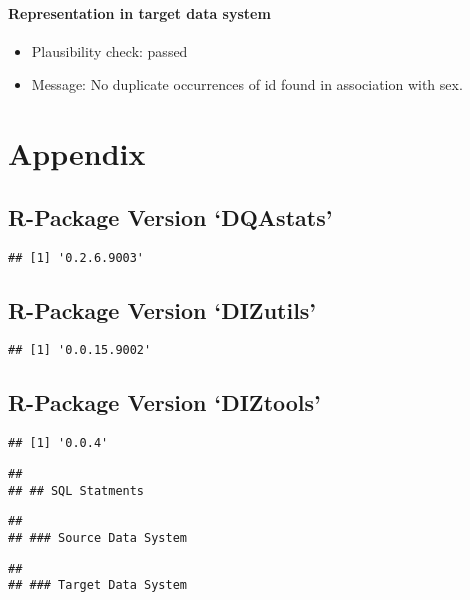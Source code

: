 \documentclass[
]{article}
\providecommand{\tightlist}{%
  \setlength{\itemsep}{0pt}\setlength{\parskip}{0pt}}
\begin{document}
\hypertarget{representation-in-target-data-system-31}{%
\paragraph{Representation in target data
system}\label{representation-in-target-data-system-31}}

\begin{itemize}
\tightlist
\item
  Plausibility check: passed
\item
  Message: No duplicate occurrences of id found in association with sex.
\end{itemize}

\newpage

\hypertarget{appendix}{%
\section{Appendix}\label{appendix}}

\hypertarget{r-package-version-dqastats}{%
\subsection{R-Package Version
`DQAstats'}\label{r-package-version-dqastats}}

\begin{verbatim}
## [1] '0.2.6.9003'
\end{verbatim}

\hypertarget{r-package-version-dizutils}{%
\subsection{R-Package Version
`DIZutils'}\label{r-package-version-dizutils}}

\begin{verbatim}
## [1] '0.0.15.9002'
\end{verbatim}

\hypertarget{r-package-version-diztools}{%
\subsection{R-Package Version
`DIZtools'}\label{r-package-version-diztools}}

\begin{verbatim}
## [1] '0.0.4'
\end{verbatim}

\begin{verbatim}
## 
## ## SQL Statments
\end{verbatim}

\begin{verbatim}
## 
## ### Source Data System
\end{verbatim}

\begin{verbatim}
## 
## ### Target Data System
\end{verbatim}
\end{document}
